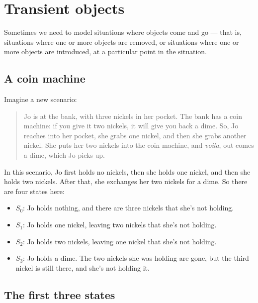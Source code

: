 \documentclass[../../../main.tex]{subfiles}
\begin{document}
\chapter{Transient objects}

Sometimes we need to model situations where objects come and go --- that is, situations where one or more objects are removed, or situations where one or more objects are introduced, at a particular point in the situation.


\section{A coin machine}

Imagine a new scenario: 

\begin{quote}
Jo is at the bank, with three nickels in her pocket. The bank has a coin machine: if you give it two nickels, it will give you back a dime. So, Jo reaches into her pocket, she grabs one nickel, and then she grabs another nickel. She puts her two nickels into the coin machine, and \emph{voila}, out comes a dime, which Jo picks up.
\end{quote}

\noindent
In this scenario, Jo first holds no nickels, then she holds one nickel, and then she holds two nickels. After that, she exchanges her two nickels for a dime. So there are four states here:

\begin{itemize}
  \item{$S_{0}$: Jo holds nothing, and there are three nickels that she's not holding.}
  \item{$S_{1}$: Jo holds one nickel, leaving two nickels that she's not holding.}
  \item{$S_{2}$: Jo holds two nickels, leaving one nickel that she's not holding.}
  \item{$S_{3}$: Jo holds a dime. The two nickels she was holding are gone, but the third nickel is still there, and she's not holding it.}
\end{itemize}


\section{The first three states}
\end{document}
